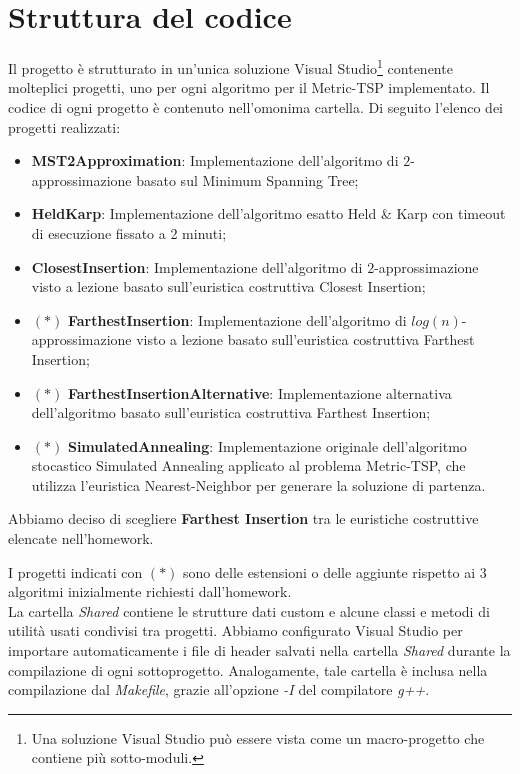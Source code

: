 \section{Struttura del codice}
\label{cap:code-structure}

Il progetto è strutturato in un'unica soluzione Visual Studio\footnote{Una soluzione Visual Studio può essere vista come un macro-progetto che contiene più sotto-moduli.} contenente molteplici progetti, uno per ogni algoritmo per il Metric-TSP implementato. Il codice di ogni progetto è contenuto nell'omonima cartella. Di seguito l'elenco dei progetti realizzati:

\begin{itemize}
    \item \textbf{MST2Approximation}: Implementazione dell'algoritmo di $2$-approssimazione basato sul Minimum Spanning Tree;
    \item \textbf{HeldKarp}: Implementazione dell'algoritmo esatto Held \& Karp con timeout di esecuzione fissato a 2 minuti;
    \item \textbf{ClosestInsertion}: Implementazione dell'algoritmo di $2$-approssimazione visto a lezione basato sull'euristica costruttiva Closest Insertion;
    \item $(*)$ \textbf{FarthestInsertion}: Implementazione dell'algoritmo di $log(n)$-approssimazione visto a lezione basato sull'euristica costruttiva Farthest Insertion;
    \item $(*)$ \textbf{FarthestInsertionAlternative}: Implementazione alternativa dell'algoritmo basato sull'euristica costruttiva Farthest Insertion;
    \item $(*)$ \textbf{SimulatedAnnealing}: Implementazione originale dell'algoritmo stocastico Simulated Annealing applicato al problema Metric-TSP, che utilizza l'euristica Nearest-Neighbor per generare la soluzione di partenza.
\end{itemize}

\noindent Abbiamo deciso di scegliere \textbf{Farthest Insertion} tra le euristiche costruttive elencate nell'homework.

\noindent I progetti indicati con $(*)$ sono delle estensioni o delle aggiunte rispetto ai 3 algoritmi inizialmente richiesti dall'homework.
\\

\noindent La cartella \textit{Shared} contiene le strutture dati custom e alcune classi e metodi di utilità usati
condivisi tra progetti. Abbiamo configurato Visual Studio per importare automaticamente i file di header salvati nella cartella \textit{Shared}
durante la compilazione di ogni sottoprogetto. Analogamente, tale cartella è inclusa nella compilazione dal \textit{Makefile}, grazie all'opzione \textit{-I} del compilatore \textit{g++}.

